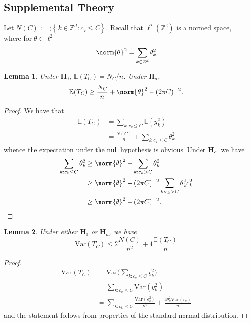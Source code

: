 \documentclass{article}
\newcommand{\set}[1]{\left\{#1\right\}}
\newcommand{\Var}{\mathrm{Var}}
\newcommand{\1}{\mathbb{I}}
\newcommand{\Ebb}{\mathbb{E}}
\theoremstyle{alden}
\theoremstyle{aldenthm}
\newtheorem{lemma}{Lemma}
\theoremstyle{definition}
\theoremstyle{remark}
\begin{document}
\subsection{Supplemental Theory}
Let $N(C) := \sharp\set{k \in \mathbb{Z}^d: c_k \leq C}$. Recall that $\ell^2(\mathbb{Z}^d)$ is a normed space, where for $\theta \in \ell^2$
\begin{equation*}
\norm{\theta}^2 = \sum_{k \in \mathbb{Z}^d} \theta_k^2
\end{equation*}
\begin{lemma}
	\label{lem: expectation}
	Under $\mathbf{H}_0$, $\Ebb(T_C) = N_C/n$. Under $\mathbf{H}_a$,
	\begin{equation*}
	\Ebb(T_C) \geq \frac{N_C}{n} + \norm{\theta}^2 - (2\pi C)^{-2}.
	\end{equation*}
\end{lemma}
\begin{proof}
	We have that
	\begin{align*}
	\Ebb(T_C) & = \sum_{k: c_k  \leq C} \Ebb(y_k^2) \\
	& = \frac{N(C)}{n} + \sum_{k:  c_k \leq C} \theta_k^2
	\end{align*}
	whence the expectation under the null hypothesis is obvious. Under $\mathbf{H}_a$, we have
	\begin{align*}
	\sum_{k:  c_k \leq C} \theta_k^2 & \geq \norm{\theta}^2 - \sum_{k:  c_k > C} \theta_k^2 \\
	& \geq \norm{\theta}^2 - (2 \pi C)^{-2} \sum_{k:  c_k > C} \theta_k^2 c_k^2 \\
	& \geq  \norm{\theta}^2 - (2 \pi C)^{-2}.
	\end{align*}
\end{proof}

\begin{lemma}
	\label{lem: var_test_statistic}
	Under either $\mathbf{H}_0$ or $\mathbf{H}_a$, we have
	\begin{equation*}
	\Var(T_C) \leq 2\frac{N(C)}{n^2} + 4\frac{\Ebb(T_C)}{n}
	\end{equation*}
\end{lemma}
\begin{proof}
	\begin{align*}
	\Var(T_C) & = \Var \bigl(\sum_{k: c_k \leq C} y_k^2 \bigr) \\
	& = \sum_{k:  c_k \leq C} \Var(y_k^2) \\
	& = \sum_{k:  c_k \leq C} \frac{\Var(\epsilon_k^2)}{n^2} + \frac{4 \theta_k^2 \Var(\epsilon_k)}{n}
	\end{align*}
	and the statement follows from properties of the standard normal distribution.
\end{proof}
\end{document}
